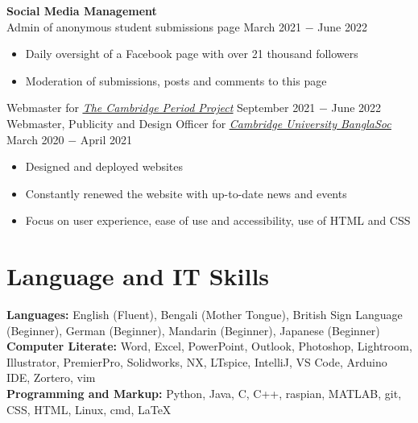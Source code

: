 \documentclass{article}
\begin{document}
\textbf{Social Media Management}\\
Admin of anonymous student submissions page \hfill March 2021 $-$ June 2022
\begin{itemize}
    \item Daily oversight of a Facebook page with over 21 thousand followers
    \item Moderation of submissions, posts and comments to this page
\end{itemize}
Webmaster for \href{http://tcpp.soc.srcf.net/}{\underline{\textit{The Cambridge Period Project}}} \hfill September 2021 $-$ June 2022\\ 
Webmaster, Publicity and Design Officer for \href{https://cambridgebanglasoc.org/}{\underline{\textit{Cambridge University BanglaSoc}}} \hfill March 2020 $-$ April 2021
\begin{itemize}
    \item Designed and deployed websites
    \item Constantly renewed the website with up-to-date news and events 
    \item Focus on user experience, ease of use and accessibility, use of HTML and CSS
\end{itemize} \medskip

\vspace{-.5\baselineskip}
\hrulefill
\vspace{-.5\baselineskip}

\section*{Language and IT Skills}
\textbf{Languages:} English (Fluent), Bengali (Mother Tongue), British Sign Language (Beginner), German (Beginner), Mandarin (Beginner), Japanese (Beginner) \\
\textbf{Computer Literate:} Word, Excel, PowerPoint, Outlook, Photoshop, Lightroom, Illustrator, PremierPro, Solidworks, NX, LTspice, IntelliJ, VS Code, Arduino IDE, Zortero, vim\\
\textbf{Programming and Markup:} Python, Java, C, C++, raspian, MATLAB, git, CSS, HTML, Linux, cmd, \LaTeX\medskip

\vspace{-.5\baselineskip}
\hrulefill
\vspace{-.5\baselineskip}
\end{document}
